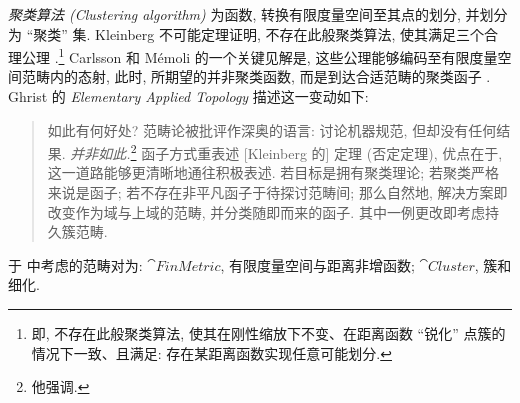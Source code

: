 \begin{example}[寻找聚类函子]
    \textit{聚类算法 (Clustering algorithm)} 为函数, 转换有限度量空间至其点的划分, 并划分为 ``聚类'' 集. Kleinberg 不可能定理证明, 不存在此般聚类算法, 使其满足三个合理公理 \cite{Kle03}.\footnote{即, 不存在此般聚类算法, 使其在刚性缩放下不变、在距离函数 ``锐化'' 点簇的情况下一致、且满足: 存在某距离函数实现任意可能划分.} Carlsson 和 M\'emoli  的一个关键见解是, 这些公理能够编码至有限度量空间范畴内的态射, 此时, 所期望的并非聚类函数, 而是到达合适范畴的聚类函子 \cite{CM13}. Ghrist 的 \textit{Elementary Applied Topology} \cite[p. 216]{Ghr14} 描述这一变动如下:
    \begin{quote}
        如此有何好处? 范畴论被批评作深奥的语言: 讨论机器规范, 但却没有任何结果. \textit{并非如此.}\footnote{他强调.} 函子方式重表述 [Kleinberg 的] 定理 (否定定理), 优点在于, 这一道路能够更清晰地通往积极表述. 若目标是拥有聚类理论; 若聚类严格来说是函子; 若不存在非平凡函子于待探讨范畴间; 那么自然地, 解决方案即改变作为域与上域的范畴, 并分类随即而来的函子. 其中一例更改即考虑持久簇范畴.
    \end{quote}
\end{example}
\par 于 \cite{CM13} 中考虑的范畴对为: \(\cat{FinMetric}\), 有限度量空间与距离非增函数; \(\cat{Cluster}\), 簇和细化. 